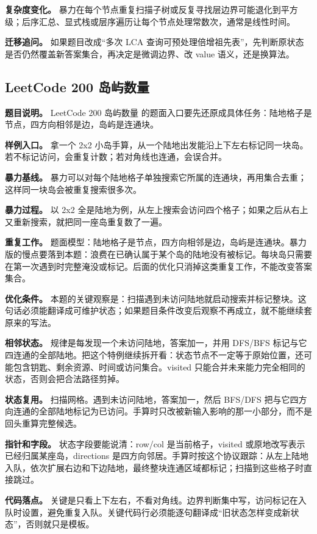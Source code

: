 \textbf{复杂度变化。} 暴力在每个节点重复扫描子树或反复寻找层边界可能退化到平方级；后序汇总、显式栈或层序遍历让每个节点处理常数次，通常是线性时间。

\textbf{迁移追问。} 如果题目改成“多次 LCA 查询可预处理倍增祖先表”，先判断原状态是否仍然覆盖新答案集合，再决定是微调边界、改 value 语义，还是换算法。

\subsection{LeetCode 200 岛屿数量}

\textbf{题目说明。} LeetCode 200 岛屿数量 的题面入口要先还原成具体任务：陆地格子是节点，四方向相邻是边，岛屿是连通块。

\textbf{样例入口。} 拿一个 2x2 小岛手算，从一个陆地出发能沿上下左右标记同一块岛。若不标记访问，会重复计数；若对角线也连通，会误合并。

\textbf{暴力基线。} 暴力可以对每个陆地格子单独搜索它所属的连通块，再用集合去重；这样同一块岛会被重复搜索很多次。

\textbf{暴力过程。} 以 2x2 全是陆地为例，从左上搜索会访问四个格子；如果之后从右上又重新搜索，就把同一座岛重复数了一遍。

\textbf{重复工作。} 题面模型：陆地格子是节点，四方向相邻是边，岛屿是连通块。暴力版的慢点要落到本题：浪费在已确认属于某个岛的陆地没有被标记。每块岛只需要在第一次遇到时完整淹没或标记。后面的优化只消掉这类重复工作，不能改变答案集合。

\textbf{优化条件。} 本题的关键观察是：扫描遇到未访问陆地就启动搜索并标记整块。这句话必须能翻译成可维护状态；如果题目条件改变后观察不再成立，就不能继续套原来的写法。

\textbf{相邻状态。} 规律是每发现一个未访问陆地，答案加一，并用 DFS/BFS 标记与它四连通的全部陆地。把这个特例继续拆开看：状态节点不一定等于原始位置，还可能包含钥匙、剩余资源、时间或访问集合。visited 只能合并未来能力完全相同的状态，否则会把合法路径剪掉。

\textbf{状态复用。} 扫描网格。遇到未访问陆地，答案加一，然后 BFS/DFS 把与它四方向连通的全部陆地标记为已访问。手算时只改被新输入影响的那一小部分，而不是回头重算完整候选。

\textbf{指针和字段。} 状态字段要能说清：row/col 是当前格子，visited 或原地改写表示已经归属某座岛，directions 是四方向邻居。手算时按这个协议跟踪：从左上陆地入队，依次扩展右边和下边陆地，最终整块连通区域都标记；扫描到这些格子时直接跳过。

\textbf{代码落点。} 关键是只看上下左右，不看对角线。边界判断集中写，访问标记在入队时设置，避免重复入队。关键代码行必须能逐句翻译成“旧状态怎样变成新状态”，否则就只是模板。

